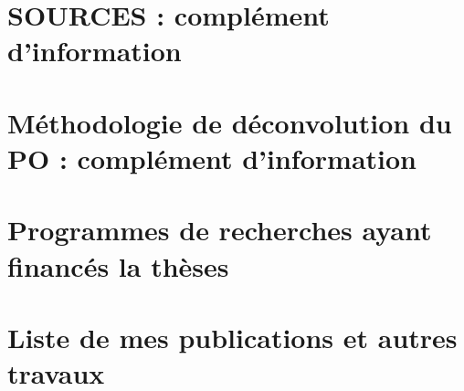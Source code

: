\documentclass[a4paper,11pt]{book}
\begin{document}
\section{\cite{weberComparison2019} SOURCES : complément d'information}
\label{annexe:SOURCES_SI}


\section{\cite{weberApportionment2018} Méthodologie de déconvolution du PO : complément d'information}
\label{annexe:deconvol_OP_SI}


\section{Programmes de recherches ayant financés la thèses}%
\label{annexe:programmes_ayant_financés_la_thèses}

\clearpage

\section{Liste de mes publications et autres travaux}
\label{annexe:CV}
% 



\end{document}
